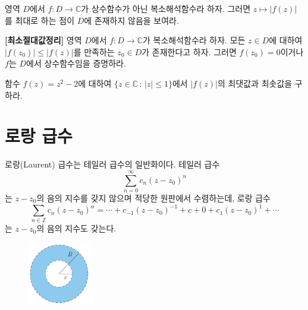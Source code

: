 \begin{salt_exercise} \label{ex-4-26}
영역 $D$에서 $f:D\to \mathbb C$가 상수함수가 아닌 복소해석함수라 하자.
그러면 $z\mapsto |f(z)|$를 최대로 하는 점이 $D$에 존재하지 않음을 보여라.
\end{salt_exercise}

\begin{salt_exercise} \textbf{[최소절대값정리]} \label{ex-4-27}
영역 $D$에서 $f:D\to \mathbb C$가 복소해석함수라 하자.
모든 $z\in D$에 대하여 $|f(z_0)| \le |f(z)|$를 만족하는 $z_0\in D$가 존재한다고 하자.
그러면 $f(z_0)=0$이거나 $f$는 $D$에서 상수함수임을 증명하라.
\end{salt_exercise}

\begin{salt_exercise} \label{ex-4-28}
함수 $f(z)=z^2-2$에 대하여
$\{z\in\mathbb C \,:\, |z|\le 1\}$에서 $|f(z)|$의 최댓값과 최솟값을 구하라.
\end{salt_exercise}

\section{로랑 급수}

로랑(Laurent) 급수는 테일러 급수의 일반화이다. 
테일러 급수
\[
\sum_{n=0}^\infty c_n(z-z_0)^n
\]
는 $z-z_0$의 음의 지수를 갖지 않으며 적당한 원판에서 수렴하는데,
로랑 급수
\[
\sum_{n\in \mathbb Z} c_n(z-z_0)^n
= \cdots + c_{-1}(z-z_0)^{-1} + c+0 + c_1(z-z_0)^1 + \cdots
\]
는 $z-z_0$의 음의 지수도 갖는다.

\begin{figure}[h!]
\begin{center}
\includegraphics[width=0.25\textwidth]{./SaltChapter/figs/fig-4-0-7}
\end{center}
\end{figure}

